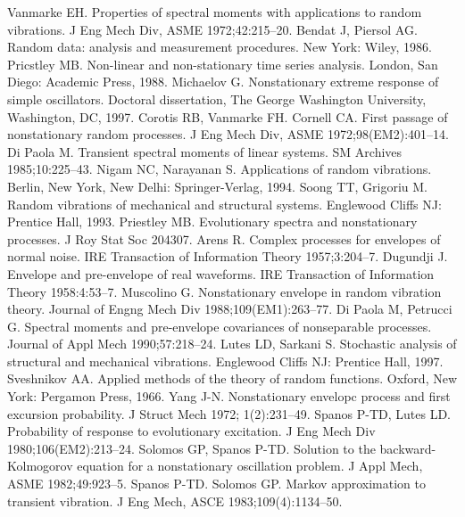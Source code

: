 \documentclass[12pt]{article}
\begin{document}
\begin{thebibliography}{99}
Vanmarke EH. Properties of spectral moments with applications to random vibrations. J Eng Mech Div, ASME 1972;42:215--20.
Bendat J, Piersol AG. Random data: analysis and measurement procedures. New York: Wiley, 1986.
Pricstley MB. Non-linear and non-stationary time series analysis. London, San Diego: Academic Press, 1988.
Michaelov G. Nonstationary extreme response of simple oscillators. Doctoral dissertation, The George Washington University, Washington, DC, 1997.
Corotis RB, Vanmarke FH. Cornell CA. First passage of nonstationary random processes. J Eng Mech Div, ASME 1972;98(EM2):401--14.
Di Paola M. Transient spectral moments of linear systems. SM Archives 1985;10:225--43.
Nigam NC, Narayanan S. Applications of random vibrations. Berlin, New York, New Delhi: Springer-Verlag, 1994.
Soong TT, Grigoriu M. Random vibrations of mechanical and structural systems. Englewood Cliffs NJ: Prentice Hall, 1993.
Priestley MB. Evolutionary spectra and nonstationary processes. J Roy Stat Soc 204307.
Arens R. Complex processes for envelopes of normal noise. IRE Transaction of Information Theory 1957;3:204--7.
Dugundji J. Envelope and pre-envelope of real waveforms. IRE Transaction of Information Theory 1958:4:53--7.
Muscolino G. Nonstationary envelope in random vibration theory. Journal of Engng Mech Div 1988;109(EM1):263--77.
Di Paola M, Petrucci G. Spectral moments and pre-envelope covariances of nonseparable processes. Journal of Appl Mech 1990;57:218--24.
Lutes LD, Sarkani S. Stochastic analysis of structural and mechanical vibrations. Englewood Cliffs NJ: Prentice Hall, 1997.
Sveshnikov AA. Applied methods of the theory of random functions. Oxford, New York: Pergamon Press, 1966.
Yang J-N. Nonstationary envelopc process and first excursion probability. J Struct Mech 1972; 1(2):231--49.
Spanos P-TD, Lutes LD. Probability of response to evolutionary excitation. J Eng Mech Div 1980;106(EM2):213--24.
Solomos GP, Spanos P-TD. Solution to the backward-Kolmogorov equation for a nonstationary oscillation problem. J Appl Mech, ASME 1982;49:923--5.
Spanos P-TD. Solomos GP. Markov approximation to transient vibration. J Eng Mech, ASCE 1983;109(4):1134--50.
\end{thebibliography}
\end{document}
